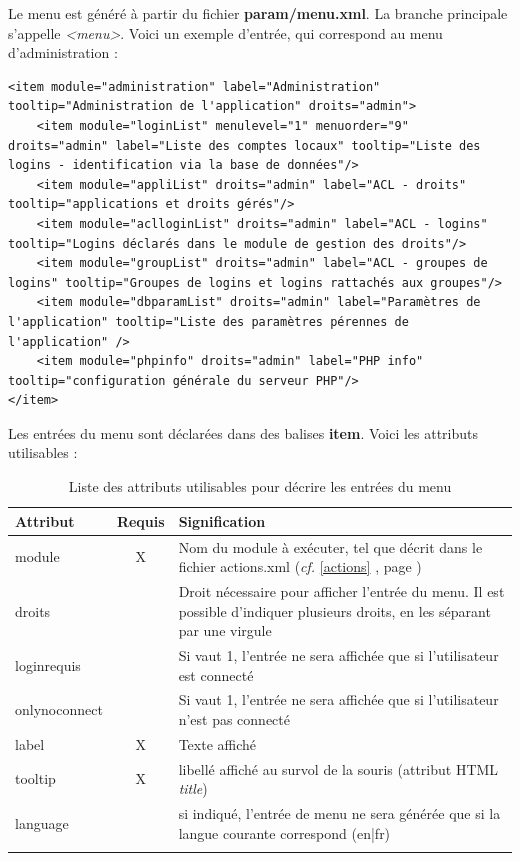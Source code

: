 Le menu est généré à partir du fichier \textbf{param/menu.xml}. La branche principale s'appelle \textit{<menu>}. Voici un exemple d'entrée, qui correspond au menu d'administration :

\begin{lstlisting}
<item module="administration" label="Administration" tooltip="Administration de l'application" droits="admin">
	<item module="loginList" menulevel="1" menuorder="9" droits="admin" label="Liste des comptes locaux" tooltip="Liste des logins - identification via la base de données"/>
	<item module="appliList" droits="admin" label="ACL - droits" tooltip="applications et droits gérés"/>
	<item module="aclloginList" droits="admin" label="ACL - logins" tooltip="Logins déclarés dans le module de gestion des droits"/>
	<item module="groupList" droits="admin" label="ACL - groupes de logins" tooltip="Groupes de logins et logins rattachés aux groupes"/>
	<item module="dbparamList" droits="admin" label="Paramètres de l'application" tooltip="Liste des paramètres pérennes de l'application" />
	<item module="phpinfo" droits="admin" label="PHP info" tooltip="configuration générale du serveur PHP"/>
</item>
\end{lstlisting}

Les entrées du menu sont déclarées dans des balises \textbf{item}. Voici les attributs utilisables :

\begin{longtable}{|p{2.5cm}|c|p{9cm}|}
\hline
\textbf{Attribut} & \textbf{Requis} & \textbf{Signification} \\
\hline
\endhead
\hline\endfoot\endlastfoot
module & X & Nom du module à exécuter, tel que décrit dans le fichier actions.xml (\textit{cf.} \ref{actions} \textit{\nameref{actions}}, page \pageref{actions})\\
droits & & Droit nécessaire pour afficher l'entrée du menu. Il est possible d'indiquer plusieurs droits, en les séparant par une virgule\\
loginrequis & & Si vaut 1, l'entrée ne sera affichée que si l'utilisateur est connecté \\
onlynoconnect & & Si vaut 1, l'entrée ne sera affichée que si l'utilisateur n'est pas connecté\\
label & X & Texte affiché\\
tooltip & X & libellé affiché au survol de la souris (attribut HTML \textit{title})\\
language & & si indiqué, l'entrée de menu ne sera générée que si la langue courante correspond (en|fr)\\
 \hline

\caption{Liste des attributs utilisables pour décrire les entrées du menu}
\end{longtable}

